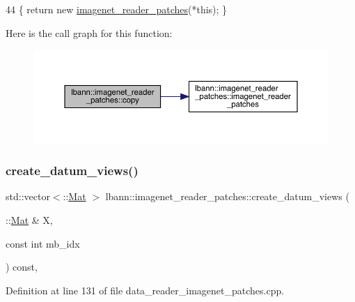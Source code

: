 \begin{DoxyCode}
44 \{ \textcolor{keywordflow}{return} \textcolor{keyword}{new} \hyperlink{classlbann_1_1imagenet__reader__patches_ab63e39d6e17dfb76b3ccb7df940c862e}{imagenet\_reader\_patches}(*\textcolor{keyword}{this}); \}
\end{DoxyCode}
Here is the call graph for this function\+:\nopagebreak
\begin{figure}[H]
\begin{center}
\leavevmode
\includegraphics[width=350pt]{classlbann_1_1imagenet__reader__patches_a6bb2c86a4416f8a74382951ab8827f1d_cgraph}
\end{center}
\end{figure}
\mbox{\label{classlbann_1_1imagenet__reader__patches_a920f235bde95d5c3e8ae97c389c9d953}} 
\subsubsection{\texorpdfstring{create\+\_\+datum\+\_\+views()}{create\_datum\_views()}}
{\footnotesize\ttfamily std\+::vector$<$\+::\hyperlink{base_8hpp_a68f11fdc31b62516cb310831bbe54d73}{Mat} $>$ lbann\+::imagenet\+\_\+reader\+\_\+patches\+::create\+\_\+datum\+\_\+views (\begin{DoxyParamCaption}\item[{\+::\hyperlink{base_8hpp_a68f11fdc31b62516cb310831bbe54d73}{Mat} \&}]{X,  }\item[{const int}]{mb\+\_\+idx }\end{DoxyParamCaption}) const\hspace{0.3cm}{\ttfamily [protected]}, {\ttfamily [virtual]}}



Definition at line 131 of file data\+\_\+reader\+\_\+imagenet\+\_\+patches.\+cpp.


